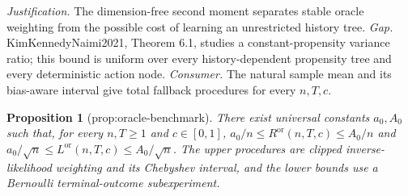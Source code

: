 \documentclass{article}
\newtheorem{proposition}{Proposition}
\begin{document}
\par\smallskip\noindent \textit{Justification.} The dimension-free second moment separates stable oracle weighting from the possible cost of learning an unrestricted history tree. \textit{Gap.} KimKennedyNaimi2021, Theorem 6.1, studies a constant-propensity variance ratio; this bound is uniform over every history-dependent propensity tree and every deterministic action node. \textit{Consumer.} The natural sample mean and its bias-aware interval give total fallback procedures for every \(n,T,c\).

\begin{proposition}[prop:oracle-benchmark]\label{prop:oracle-benchmark}
There exist universal constants \(a_0,A_0\) such that, for every \(n,T\geq1\) and \(c\in[0,1]\), \(a_0/n\leq R^{\mathrm{or}}(n,T,c)\leq A_0/n\) and \(a_0/\sqrt n\leq L^{\mathrm{or}}(n,T,c)\leq A_0/\sqrt n\). The upper procedures are clipped inverse-likelihood weighting and its Chebyshev interval, and the lower bounds use a Bernoulli terminal-outcome subexperiment.
\end{proposition}
\end{document}
